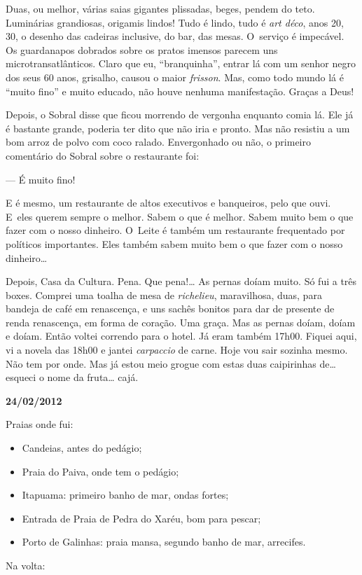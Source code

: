 Duas, ou melhor, várias saias gigantes plissadas, beges, pendem do teto.
Luminárias grandiosas, origamis lindos! Tudo é lindo, tudo é \emph{art
déco}, anos 20, 30, o desenho das cadeiras inclusive, do bar, das mesas.
O~serviço é impecável. Os guardanapos dobrados sobre os pratos imensos
parecem uns microtransatlânticos. Claro que eu, ``branquinha'', entrar
lá com um senhor negro dos seus 60 anos, grisalho, causou o maior
\emph{frisson}. Mas, como todo mundo lá é ``muito fino'' e muito
educado, não houve nenhuma manifestação. Graças a Deus!

Depois, o Sobral disse que ficou morrendo de vergonha enquanto comia lá.
Ele já é bastante grande, poderia ter dito que não iria e pronto. Mas
não resistiu a um bom arroz de polvo com coco ralado. Envergonhado ou
não, o primeiro comentário do Sobral sobre o restaurante foi:

--- É muito fino!

E é mesmo, um restaurante de altos executivos e banqueiros, pelo que
ouvi. E~eles querem sempre o melhor. Sabem o que é melhor. Sabem muito
bem o que fazer com o nosso dinheiro. O~Leite é também um restaurante
frequentado por políticos importantes. Eles também sabem muito bem o que
fazer com o nosso dinheiro…

Depois, Casa da Cultura. Pena. Que pena!… As pernas doíam muito.
Só fui a três boxes. Comprei uma toalha de mesa de \emph{richelieu},
maravilhosa, duas, para bandeja de café em renascença, e uns sachês
bonitos para dar de presente de renda renascença, em forma de coração.
Uma graça. Mas as pernas doíam, doíam e doíam. Então voltei correndo
para o hotel. Já eram também 17h00. Fiquei aqui, vi a novela das 18h00 e
jantei \emph{carpaccio} de carne. Hoje vou sair sozinha mesmo. Não tem
por onde. Mas já estou meio grogue com estas duas caipirinhas de…
esqueci o nome da fruta… cajá.

\begin{flushright}\textbf{24/02/2012}\end{flushright}


Praias onde fui:

\begin{itemize}
\item
  Candeias, antes do pedágio;
\item
  Praia do Paiva, onde tem o pedágio;
\item
  Itapuama: primeiro banho de mar, ondas fortes;
\item
  Entrada de Praia de Pedra do Xaréu, bom para pescar;
\item
  Porto de Galinhas: praia mansa, segundo banho de mar, arrecifes.
\end{itemize}
Na volta:

